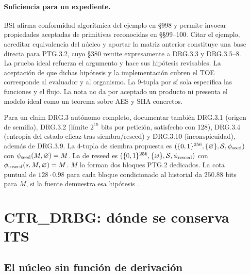 \documentclass[11pt,a4paper]{article}
\newcommand{\bits}{\{0,1\}}
\begin{document}
\paragraph{Suficiencia para un expediente.}
BSI afirma conformidad algorítmica del ejemplo en §998 y permite
invocar propiedades aceptadas de primitivas reconocidas en §§99--100.
Citar el ejemplo, acreditar equivalencia del núcleo y aportar la matriz
anterior constituye una base directa para PTG.3.2, cuyo §380 remite
expresamente a DRG.3.3 y DRG.3.5--8. La prueba ideal refuerza el
argumento y hace sus hipótesis revisables. La aceptación de que dichas
hipótesis y la implementación cubren el TOE corresponde al evaluador y
al organismo. La 9-tupla por sí sola especifica las funciones y el flujo.
La nota no da por aceptado un producto ni presenta el modelo ideal como
un teorema sobre AES y SHA concretos.

Para un claim DRG.3 autónomo completo, documentar también DRG.3.1
(origen de semilla), DRG.3.2 (límite $2^{19}$ bits por petición,
satisfecho con 128), DRG.3.4 (entropía del estado eficaz tras
siembra/reseed) y DRG.3.10 (inconspicuidad), además de DRG.3.9.
La 4-tupla de siembra propuesta es
$(\bits^{256},\{\varnothing\},\mathcal S,\phi_{\rm seed})$
con $\phi_{\rm seed}(M,\varnothing)=M$. La de reseed es
$(\bits^{256},\{\varnothing\},\mathcal S,\phi_{\rm reseed})$
con $\phi_{\rm reseed}(s,M,\varnothing)=M$. $M$ lo forman
dos bloques PTG.2 dedicados. La cota puntual de $128\cdot0.98$
para cada bloque condicionado al historial da $250.88$ bits
para $M$, si la fuente demuestra esa hipótesis
\cite[§§146--164, 207, 211--214, 380 y 996--998]{ais}.

\section{CTR\_DRBG: dónde se conserva ITS}

\subsection{El núcleo sin función de derivación}
\end{document}
